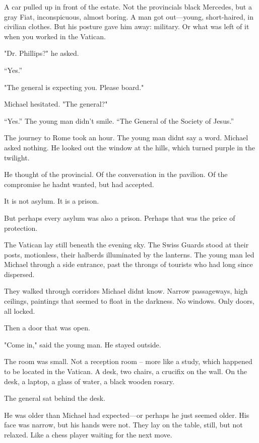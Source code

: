 \documentclass[
]{article}
\begin{document}
A car pulled up in front of the estate. Not the provincial\textquotesingle s black Mercedes, but a gray Fiat, inconspicuous, almost boring. A man got out---young, short-haired, in civilian clothes. But his posture gave him away: military. Or what was left of it when you worked in the Vatican.

"Dr. Phillips?" he asked.

``Yes.''

"The general is expecting you. Please board."

Michael hesitated. "The general?"

``Yes.'' The young man didn't smile. ``The General of the Society of Jesus.''

The journey to Rome took an hour. The young man didn\textquotesingle t say a word. Michael asked nothing. He looked out the window at the hills, which turned purple in the twilight.

He thought of the provincial. Of the conversation in the pavilion. Of the compromise he hadn\textquotesingle t wanted, but had accepted.

It is not asylum. It is a prison.

But perhaps every asylum was also a prison. Perhaps that was the price of protection.

The Vatican lay still beneath the evening sky. The Swiss Guards stood at their posts, motionless, their halberds illuminated by the lanterns. The young man led Michael through a side entrance, past the throngs of tourists who had long since dispersed.

They walked through corridors Michael didn\textquotesingle t know. Narrow passageways, high ceilings, paintings that seemed to float in the darkness. No windows. Only doors, all locked.

Then a door that was open.

"Come in," said the young man. He stayed outside.

The room was small. Not a reception room -- more like a study, which happened to be located in the Vatican. A desk, two chairs, a crucifix on the wall. On the desk, a laptop, a glass of water, a black wooden rosary.

The general sat behind the desk.

He was older than Michael had expected---or perhaps he just seemed older. His face was narrow, but his hands were not. They lay on the table, still, but not relaxed. Like a chess player waiting for the next move.
\end{document}
